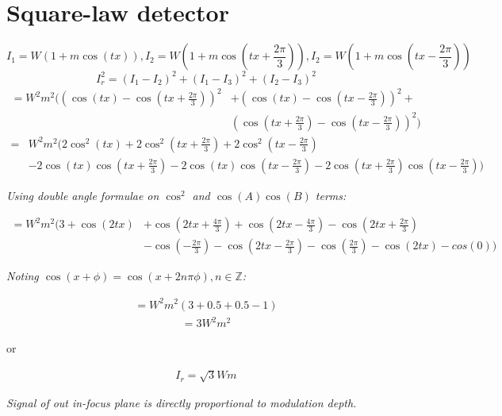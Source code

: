 \documentclass[11pt]{article}
\begin{document}
\section*{Square-law detector}
\begin{equation*}
I_1 = W(1+m\cos(tx)), I_2 = W(1+m\cos(tx+\frac{2\pi}{3})), I_2 = W(1+m\cos(tx-\frac{2\pi}{3}))
\end{equation*}
\begin{equation*}
I_r^2 = (I_1 - I_2)^2 + (I_1 - I_3)^2 + (I_2 - I_3)^2
\end{equation*}
\begin{align*}
=W^2m^2\Bigg(\left(\cos(tx)-\cos(tx+\frac{2\pi}{3})\right)^2&+\left(\cos(tx)-\cos(tx-\frac{2\pi}{3})\right)^2+\\&\left(\cos(tx+\frac{2\pi}{3})-\cos(tx-\frac{2\pi}{3})\right)^2\Bigg)
\end{align*}
\begin{align*}
=& W^2m^2\Big(2\cos^2(tx) + 2\cos^2(tx+\frac{2\pi}{3}) + 2\cos^2(tx-\frac{2\pi}{3}) 
 \\& - 2\cos(tx)\cos(tx+\frac{2\pi}{3}) - 2\cos(tx)\cos(tx-\frac{2\pi}{3}) - 2\cos(tx+\frac{2\pi}{3})\cos(tx-\frac{2\pi}{3})\Big)
\end{align*}

\textit{Using double angle formulae on $\cos^2$ and $\cos(A)\cos(B)$ terms:}

\begin{align*}
= W^2m^2\Big(3 + \cos(2tx) &+ \cos(2tx+\frac{4\pi}{3}) + \cos(2tx-\frac{4\pi}{3})
- \cos(2tx+\frac{2\pi}{3}) \\&- \cos(-\frac{2\pi}{3}) - \cos(2tx-\frac{2\pi}{3}) - \cos(\frac{2\pi}{3}) -\cos(2tx) - cos(0)\Big)
\end{align*}

\textit{Noting $\cos(x+\phi) = \cos(x+2n\pi\phi), n\in \mathbb{Z}$:}

\begin{align*}
= W^2m^2(3 + 0.5 + 0.5 - 1)
\end{align*}
\begin{align*}
= 3W^2m^2
\end{align*}

or

\begin{align*}
I_r = \sqrt3Wm
\end{align*}


\textit{Signal of out in-focus plane is directly proportional to modulation depth.}

\newpage
\end{document}
